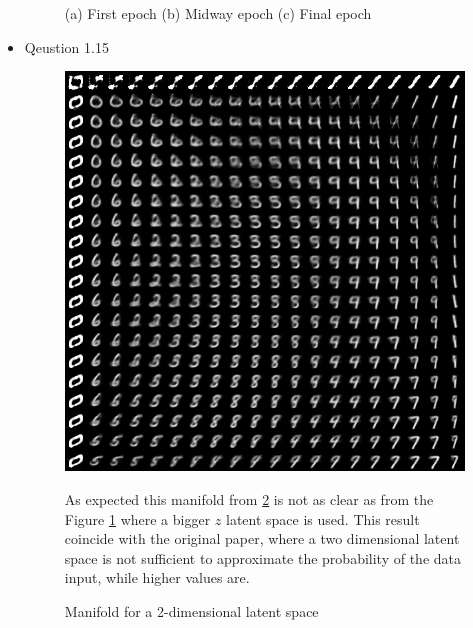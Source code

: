 \documentclass{article}
\begin{document}
\begin{itemize}
\begin{figure}[htbp]
        \caption{(a) First epoch (b) Midway epoch (c) Final epoch}
        \label{fig:progress_vae}
      \end{figure}
      \item Qeustion 1.15 \\
      \begin{figure}[H]
        \centering
        \includegraphics[width=\linewidth]{manifold.png}
        \caption{Manifold for a 2-dimensional latent space}
        \label{fig:manifold}
        As expected this manifold from \ref{fig:manifold} is not as clear as from the Figure \ref{fig:progress_vae} where a bigger $z$ latent space is used. This result coincide with the original paper, where a two dimensional latent space is not sufficient to approximate the probability of the data input, while higher values are. 
      \end{figure}
    \end{itemize}
\end{document}
